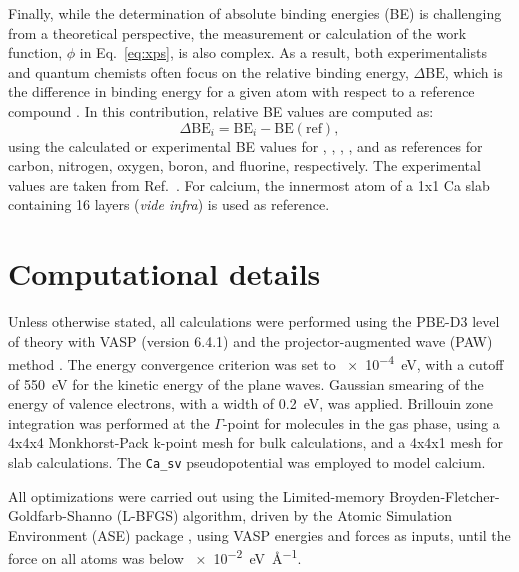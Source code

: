 \documentclass[journal=jpccck,manuscript=article]{achemso}
\begin{document}
Finally, while the determination of absolute binding energies (BE) is challenging from a theoretical perspective, the measurement or calculation of the work function, $\phi$ in Eq.~\eqref{eq:xps}, is also complex. As a result, both experimentalists and quantum chemists often focus on the relative binding energy, $\Delta\text{BE}$, which is the difference in binding energy for a given atom with respect to a reference compound \cite{vinesPredictionCoreLevel2018}. In this contribution, relative BE values are computed as:\begin{equation}
	\Delta\text{BE}_i = \text{BE}_i - \text{BE}(\text{ref}), \label{eq:dbe}
\end{equation} 
using the calculated or experimental BE values for , , , , and  as references for carbon, nitrogen, oxygen, boron, and fluorine, respectively. The experimental values are taken from Ref.~. For calcium, the innermost atom of a 1x1 Ca slab containing 16 layers (\textit{vide infra}) is used as reference.

	
\section{Computational details}

Unless otherwise stated, all calculations were performed using the PBE-D3 level of theory with VASP (version 6.4.1) and the projector-augmented wave (PAW) method \cite{blochlProjectorAugmentedwaveMethod1994}. The energy convergence criterion was set to \SI{e-4}{\electronvolt}, with a cutoff of \SI{550}{\electronvolt} for the kinetic energy of the plane waves. Gaussian smearing of the energy of valence electrons, with a width of \SI{0.2}{\electronvolt}, was applied. Brillouin zone integration was performed at the $\Gamma$-point for molecules in the gas phase, using a 4x4x4 Monkhorst-Pack k-point mesh\cite{monkhorstSpecialPointsBrillouinzone1976} for bulk calculations, and a 4x4x1 mesh for slab calculations. The \texttt{Ca\_sv} pseudopotential\cite{blochlProjectorAugmentedwaveMethod1994,kresseUltrasoftPseudopotentialsProjector1999} was employed to model calcium.

All optimizations were carried out using the Limited-memory Broyden-Fletcher-Goldfarb-Shanno  (L-BFGS) algorithm, driven by the Atomic Simulation Environment (ASE) package \cite{larsenAtomicSimulationEnvironment2017}, using VASP energies and forces as inputs, until the force on all atoms was below \SI{e-2}{\electronvolt\per\angstrom}.
\end{document}
